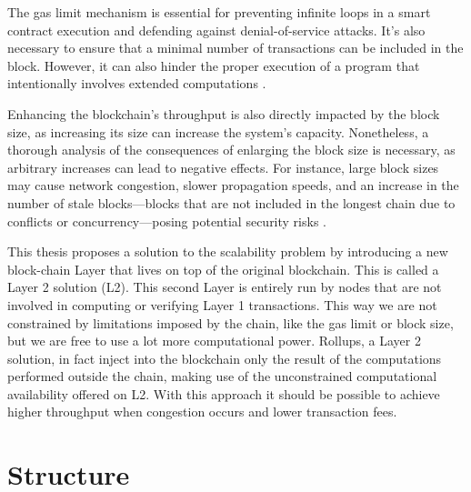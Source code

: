 The gas limit mechanism is essential for preventing infinite loops in a smart contract execution and defending against denial-of-service attacks. It's also necessary to ensure that a minimal number of transactions can be included in the block. However, it can also hinder the proper execution of a program that intentionally involves extended computations \cite{wood_ethereum_nodate}.

Enhancing the blockchain's throughput is also directly impacted by the block size, as increasing its size can increase the system's capacity. Nonetheless, a thorough analysis of the consequences of enlarging the block size is necessary, as arbitrary increases can lead to negative effects. For instance, large block sizes may cause network congestion, slower propagation speeds, and an increase in the number of stale blocks—blocks that are not included in the longest chain due to conflicts or concurrency—posing potential security risks \cite{gervais_security_2016}.

This thesis proposes a solution to the scalability problem by introducing a new block-chain Layer that lives on top of the original blockchain. This is called a Layer 2 solution (L2). This second Layer is entirely run by nodes that are not involved in computing or verifying Layer 1 transactions. This way we are not constrained by limitations imposed by the chain, like the gas limit or block size, but we are free to use a lot more computational power. Rollups, a Layer 2 solution, in fact inject into the blockchain only the result of the computations performed outside the chain, making use of the unconstrained computational availability offered on L2. With this approach it should be possible to achieve higher throughput when congestion occurs and lower transaction fees. 


\section{Structure\label{sec:structure}}


